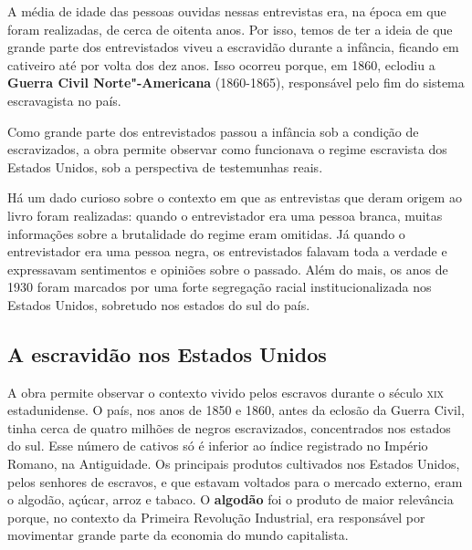 \documentclass[11pt]{extarticle}
\begin{document}
\begin{enumerate}
\begin{enumerate}
\begin{enumerate}
A média de idade das pessoas ouvidas nessas entrevistas era, na época em
que foram realizadas, de cerca de oitenta anos. Por isso, temos de ter a
ideia de que grande parte dos entrevistados viveu a escravidão durante a
infância, ficando em cativeiro até por volta dos dez anos. Isso ocorreu
porque, em 1860, eclodiu a \textbf{Guerra Civil Norte"-Americana}
(1860-1865), responsável pelo fim do sistema escravagista no país.

Como grande parte dos entrevistados passou a infância sob a condição de
escravizados, a obra permite observar como funcionava o regime
escravista dos Estados Unidos, sob a perspectiva de testemunhas reais.






Há um dado curioso sobre o contexto em que as entrevistas que deram
origem ao livro foram realizadas: quando o entrevistador era uma pessoa
branca, muitas informações sobre a brutalidade do regime eram omitidas.
Já quando o entrevistador era uma pessoa negra, os entrevistados falavam
toda a verdade e expressavam sentimentos e opiniões sobre o passado.
Além do mais, os anos de 1930 foram marcados por uma forte segregação
racial institucionalizada nos Estados Unidos, sobretudo nos estados do
sul do país.

\subsection{A escravidão nos Estados Unidos}

A obra permite observar o contexto vivido pelos escravos durante o
século \textsc{xix} estadunidense. O país, nos anos de 1850 e 1860, antes da
eclosão da Guerra Civil, tinha cerca de quatro milhões de negros
escravizados, concentrados nos estados do sul. Esse número de cativos só
é inferior ao índice registrado no Império Romano, na Antiguidade. Os
principais produtos cultivados nos Estados Unidos, pelos senhores de
escravos, e que estavam voltados para o mercado externo, eram o algodão,
açúcar, arroz e tabaco. O \textbf{algodão} foi o produto de maior
relevância porque, no contexto da Primeira Revolução Industrial, era
responsável por movimentar grande parte da economia do mundo
capitalista.



\end{enumerate}
\end{enumerate}
\end{enumerate}
\end{document}
